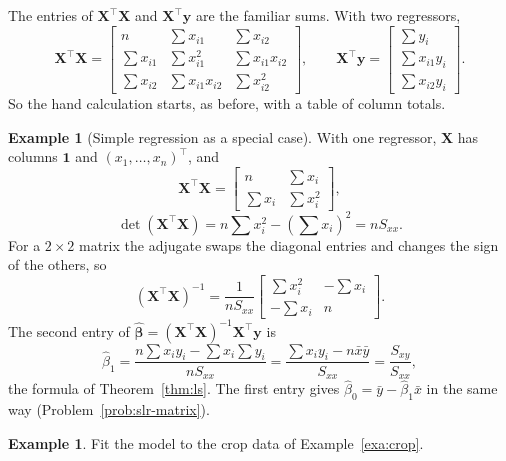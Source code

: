 \documentclass[11pt,a4paper]{article}
\numberwithin{equation}{section}
\theoremstyle{definition}
\newtheorem{exa}[thm]{Example}
\begin{document}
The entries of $\mathbf{X}^\top\mathbf{X}$ and $\mathbf{X}^\top\mathbf{y}$ are the familiar
sums. With two regressors,
\[
\mathbf{X}^\top\mathbf{X} = \begin{bmatrix}
n & \sum x_{i1} & \sum x_{i2} \\
\sum x_{i1} & \sum x_{i1}^2 & \sum x_{i1}x_{i2} \\
\sum x_{i2} & \sum x_{i1}x_{i2} & \sum x_{i2}^2
\end{bmatrix},
\qquad
\mathbf{X}^\top\mathbf{y} = \begin{bmatrix} \sum y_i \\ \sum x_{i1} y_i \\ \sum x_{i2} y_i \end{bmatrix} .
\]
So the hand calculation starts, as before, with a table of column totals.

\begin{exa}[Simple regression as a special case]\label{exa:slr-matrix}
With one regressor, $\mathbf{X}$ has columns $\mathbf{1}$ and $(x_1, \dots, x_n)^\top$, and
\[
\mathbf{X}^\top\mathbf{X} = \begin{bmatrix} n & \sum x_i \\ \sum x_i & \sum x_i^2 \end{bmatrix},
\]
\[
\det(\mathbf{X}^\top\mathbf{X}) = n\sum x_i^2 - \left(\sum x_i\right)^2 = nS_{xx} .
\]
For a $2 \times 2$ matrix the adjugate swaps the diagonal entries and changes the sign of the
others, so
\[
(\mathbf{X}^\top\mathbf{X})^{-1} = \frac{1}{nS_{xx}} \begin{bmatrix} \sum x_i^2 & -\sum x_i \\ -\sum x_i & n \end{bmatrix} .
\]
The second entry of $\hat{\boldsymbol\beta} = (\mathbf{X}^\top\mathbf{X})^{-1}\mathbf{X}^\top\mathbf{y}$ is
\[
\hat\beta_1 = \frac{n\sum x_i y_i - \sum x_i \sum y_i}{nS_{xx}}
= \frac{\sum x_i y_i - n\bar x \bar y}{S_{xx}} = \frac{S_{xy}}{S_{xx}} ,
\]
the formula of Theorem~\ref{thm:ls}. The first entry gives $\hat\beta_0 = \bar y - \hat\beta_1\bar x$
in the same way (Problem~\ref{prob:slr-matrix}).
\end{exa}

\begin{exa}\label{exa:crop-fit}
Fit the model to the crop data of Example~\ref{exa:crop}.
\end{exa}
\end{document}
